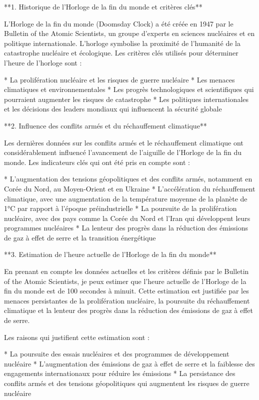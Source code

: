 **1. Historique de l'Horloge de la fin du monde et critères clés**

L'Horloge de la fin du monde (Doomsday Clock) a été créée en 1947 par le Bulletin of the Atomic Scientists, un groupe d'experts en sciences nucléaires et en politique internationale. L'horloge symbolise la proximité de l'humanité de la catastrophe nucléaire et écologique. Les critères clés utilisés pour déterminer l'heure de l'horloge sont :

* La prolifération nucléaire et les risques de guerre nucléaire
* Les menaces climatiques et environnementales
* Les progrès technologiques et scientifiques qui pourraient augmenter les risques de catastrophe
* Les politiques internationales et les décisions des leaders mondiaux qui influencent la sécurité globale

**2. Influence des conflits armés et du réchauffement climatique**

Les dernières données sur les conflits armés et le réchauffement climatique ont considérablement influencé l'avancement de l'aiguille de l'Horloge de la fin du monde. Les indicateurs clés qui ont été pris en compte sont :

* L'augmentation des tensions géopolitiques et des conflits armés, notamment en Corée du Nord, au Moyen-Orient et en Ukraine
* L'accélération du réchauffement climatique, avec une augmentation de la température moyenne de la planète de 1°C par rapport à l'époque préindustrielle
* La poursuite de la prolifération nucléaire, avec des pays comme la Corée du Nord et l'Iran qui développent leurs programmes nucléaires
* La lenteur des progrès dans la réduction des émissions de gaz à effet de serre et la transition énergétique

**3. Estimation de l'heure actuelle de l'Horloge de la fin du monde**

En prenant en compte les données actuelles et les critères définis par le Bulletin of the Atomic Scientists, je peux estimer que l'heure actuelle de l'Horloge de la fin du monde est de 100 secondes à minuit. Cette estimation est justifiée par les menaces persistantes de la prolifération nucléaire, la poursuite du réchauffement climatique et la lenteur des progrès dans la réduction des émissions de gaz à effet de serre.

Les raisons qui justifient cette estimation sont :

* La poursuite des essais nucléaires et des programmes de développement nucléaire
* L'augmentation des émissions de gaz à effet de serre et la faiblesse des engagements internationaux pour réduire les émissions
* La persistance des conflits armés et des tensions géopolitiques qui augmentent les risques de guerre nucléaire

